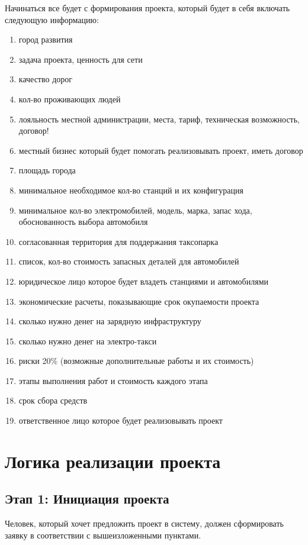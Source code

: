 \documentclass[a4paper,12pt]{report}
\begin{document}
Начинаться все будет с формирования проекта, который будет в себя включать следующую информацию:

\begin{enumerate}
	
	\item город развития
	\item задача проекта, ценность для сети
	\item качество дорог
	\item кол-во проживающих людей 
	\item лояльность местной администрации, места, тариф, техническая возможность, договор!
	\item местный бизнес который будет помогать реализовывать проект, иметь договор
	\item площадь города
	\item минимальное необходимое кол-во станций и их конфигурация
	\item минимальное кол-во электромобилей, модель, марка, запас хода, обоснованность выбора автомобиля
	\item согласованная территория для поддержания таксопарка
	\item список, кол-во стоимость запасных деталей для автомобилей
	\item юридическое лицо которое будет владеть станциями и автомобилями
	\item экономические расчеты, показывающие срок окупаемости проекта 
	\item сколько нужно денег на зарядную инфраструктуру
	\item сколько нужно денег на электро-такси
	\item риски 20\% (возможные дополнительные работы и их стоимость)
	\item этапы выполнения работ и стоимость каждого этапа
	\item срок сбора средств
	\item ответственное лицо которое будет реализовывать проект

\end{enumerate}
 
\section{Логика реализации проекта}

\subsection{Этап 1: Инициация проекта}
	Человек, который хочет предложить проект в систему, должен сформировать заявку в соответствии с вышеизложенными пунктами. 
\end{document}
